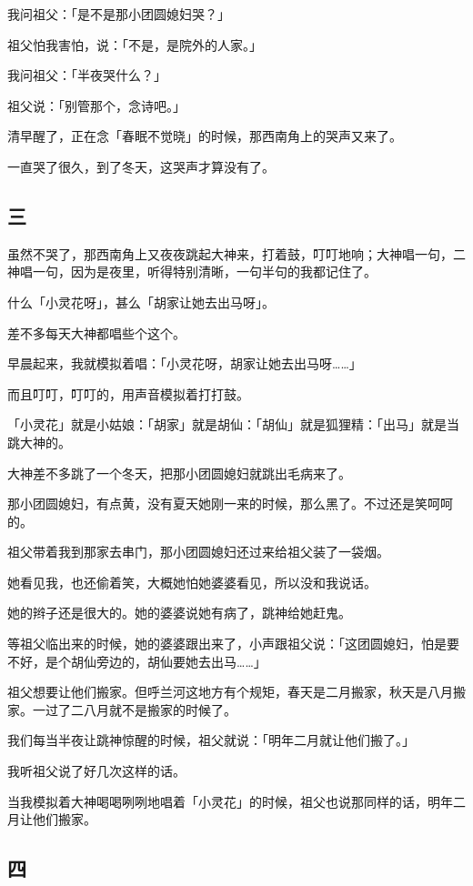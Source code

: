 \documentclass[UTF8]{ctexart}
\begin{document}
我问祖父：「是不是那小团圆媳妇哭？」

祖父怕我害怕，说：「不是，是院外的人家。」

我问祖父：「半夜哭什么？」

祖父说：「别管那个，念诗吧。」

清早醒了，正在念「春眠不觉晓」的时候，那西南角上的哭声又来了。

一直哭了很久，到了冬天，这哭声才算没有了。

\subsection{三}

虽然不哭了，那西南角上又夜夜跳起大神来，打着鼓，叮叮地响；大神唱一句，二神唱一句，因为是夜里，听得特别清晰，一句半句的我都记住了。

什么「小灵花呀」，甚么「胡家让她去出马呀」。

差不多每天大神都唱些个这个。

早晨起来，我就模拟着唱：「小灵花呀，胡家让她去出马呀……」

而且叮叮，叮叮的，用声音模拟着打打鼓。

「小灵花」就是小姑娘：「胡家」就是胡仙：「胡仙」就是狐狸精：「出马」就是当跳大神的。

大神差不多跳了一个冬天，把那小团圆媳妇就跳出毛病来了。

那小团圆媳妇，有点黄，没有夏天她刚一来的时候，那么黑了。不过还是笑呵呵的。

祖父带着我到那家去串门，那小团圆媳妇还过来给祖父装了一袋烟。

她看见我，也还偷着笑，大概她怕她婆婆看见，所以没和我说话。

她的辫子还是很大的。她的婆婆说她有病了，跳神给她赶鬼。

等祖父临出来的时候，她的婆婆跟出来了，小声跟祖父说：「这团圆媳妇，怕是要不好，是个胡仙旁边的，胡仙要她去出马……」

祖父想要让他们搬家。但呼兰河这地方有个规矩，春天是二月搬家，秋天是八月搬家。一过了二八月就不是搬家的时候了。

我们每当半夜让跳神惊醒的时候，祖父就说：「明年二月就让他们搬了。」

我听祖父说了好几次这样的话。

当我模拟着大神喝喝咧咧地唱着「小灵花」的时候，祖父也说那同样的话，明年二月让他们搬家。

\subsection{四}
\end{document}
